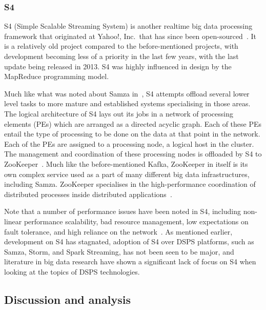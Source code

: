 

\subsubsection{S4} %
\label{ssub:s4}

S4 (Simple Scalable Streaming System) is another realtime big data processing framework that originated at Yahoo!, Inc.\
that has since been open-sourced~\cite{neumeyer2010s4}. It is a relatively old project compared to the before-mentioned
projects, with development becoming less of a priority in the last few years, with the last update being released in 2013.
S4 was highly influenced in design by the MapReduce programming model.

Much like what was noted about Samza in~, S4 attempts offload several lower level tasks to more
mature and established systems specialising in those areas. The logical architecture of S4 lays out its jobs in a
network of processing elements (PEs) which are arranged as a directed acyclic graph. Each of these PEs entail the type
of processing to be done on the data at that point in the network. Each of the PEs are assigned to a processing node, a
logical host in the cluster. The management and coordination of these processing nodes is offloaded by S4 to
ZooKeeper~\cite{kamburugamuve_survey_2014}. Much like the before-mentioned Kafka, ZooKeeper in itself is its own complex
service used as a part of many different big data infrastructures, including Samza. ZooKeeper specialises in the
high-performance coordination of distributed processes inside distributed applications~\cite{hunt2010zookeeper}.

Note that a number of performance issues have been noted in S4, including non-linear performance scalability, bad
resource management, low expectations on fault tolerance, and high reliance on the network~\cite{chauhan2012performance}.
As mentioned earlier, development on S4 has stagnated, adoption of S4 over DSPS platforms, such as Samza, Storm,
and Spark Streaming, has not been seen to be major, and literature in big data research have shown a significant lack of
focus on S4 when looking at the topics of DSPS technologies.




\subsection{Discussion and analysis} %
\label{sub:processing_conclusion}

